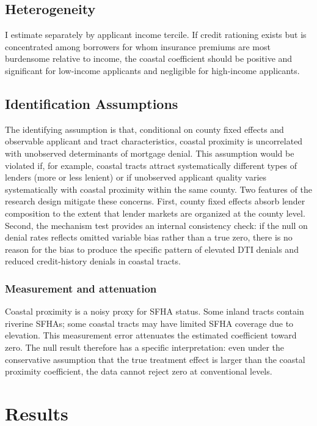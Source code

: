 \documentclass[12pt]{article}
\begin{document}
\subsection{Heterogeneity}

I estimate  separately by applicant income tercile. If credit rationing exists but is concentrated among borrowers for whom insurance premiums are most burdensome relative to income, the coastal coefficient should be positive and significant for low-income applicants and negligible for high-income applicants.

\subsection{Identification Assumptions}

The identifying assumption is that, conditional on county fixed effects and observable applicant and tract characteristics, coastal proximity is uncorrelated with unobserved determinants of mortgage denial. This assumption would be violated if, for example, coastal tracts attract systematically different types of lenders (more or less lenient) or if unobserved applicant quality varies systematically with coastal proximity within the same county. Two features of the research design mitigate these concerns. First, county fixed effects absorb lender composition to the extent that lender markets are organized at the county level. Second, the mechanism test provides an internal consistency check: if the null on denial rates reflects omitted variable bias rather than a true zero, there is no reason for the bias to produce the specific pattern of elevated DTI denials and reduced credit-history denials in coastal tracts.

\subsubsection*{Measurement and attenuation} Coastal proximity is a noisy proxy for SFHA status. Some inland tracts contain riverine SFHAs; some coastal tracts may have limited SFHA coverage due to elevation. This measurement error attenuates the estimated coefficient toward zero. The null result therefore has a specific interpretation: even under the conservative assumption that the true treatment effect is larger than the coastal proximity coefficient, the data cannot reject zero at conventional levels.


\section{Results}
\label{sec:results}
\end{document}
